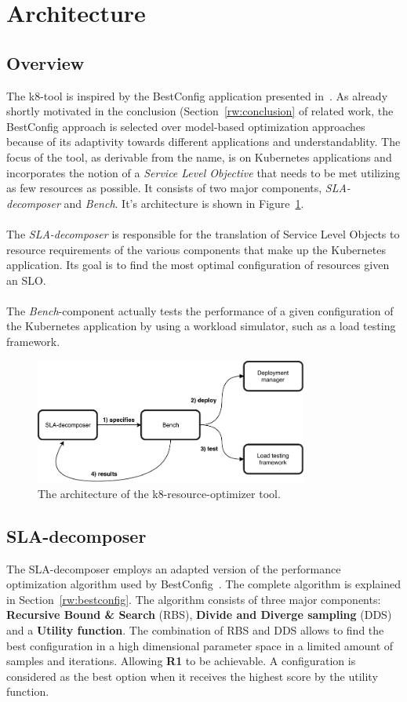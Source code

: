\section{Architecture}
\subsection{Overview}
The k8-tool is inspired by the BestConfig application presented in~\cite{zhu2017bestconfig}. As already shortly motivated in the conclusion (Section~\ref{rw:conclusion} of related work, the BestConfig approach is selected over model-based optimization approaches because of its adaptivity towards different applications and understandablity.  The focus of the tool, as derivable from the name, is on Kubernetes applications and incorporates the notion of a \textit{Service Level Objective} that needs to be met utilizing as few resources as possible. It consists of two major components, \textit{SLA-decomposer} and \textit{Bench}. It's architecture is shown in Figure~\ref{fig:k8-architecture}.\\\\ The \textit{SLA-decomposer} is responsible for the translation of Service Level Objects to resource requirements of the various components that make up the Kubernetes application. Its goal is to find the most optimal configuration of resources given an SLO. \\\\
The \textit{Bench}-component actually tests the performance of a given configuration of the Kubernetes application by using a workload simulator, such as a load testing framework. 

\begin{figure}[H]
    \centering
    \includegraphics[width=0.8\textwidth]{chapter-k8-bench/k8-bench-architecture.pdf}
    \caption{The architecture of the k8-resource-optimizer tool.}
    \label{fig:k8-architecture}
\end{figure}
\subsection{SLA-decomposer}
The SLA-decomposer employs an adapted version of the performance optimization algorithm used by BestConfig~\cite{zhu2017bestconfig}. The complete algorithm is explained in Section~\ref{rw:bestconfig}. The algorithm consists of three major components:\textbf{ Recursive Bound \& Search} (RBS), \textbf{Divide and Diverge sampling} (DDS) and a \textbf{Utility function}.
The combination of RBS and DDS allows to find the best configuration in a high dimensional parameter space in a limited amount of samples and iterations. Allowing \textbf{R1} to be achievable. A configuration is considered as the best option when it receives the highest score by the utility function.
